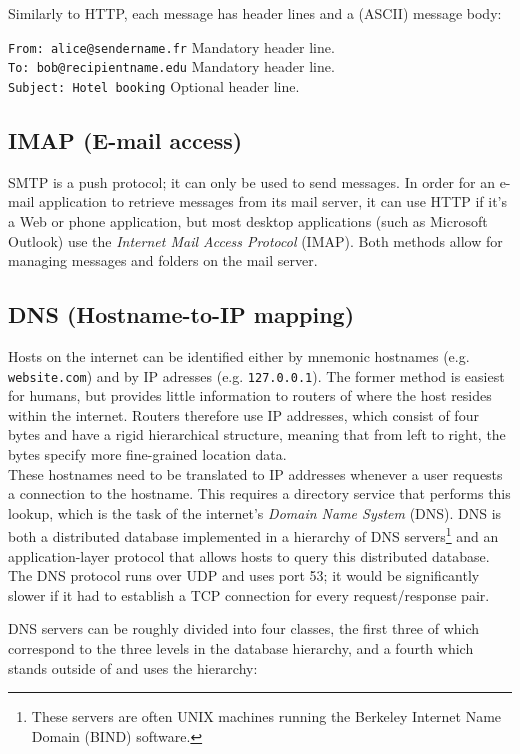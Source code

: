 \documentclass[table, xcdraw]{article}%
\begin{document}
Similarly to HTTP, each message has header lines and a (ASCII) message body:

\texttt{From: alice@sendername.fr} Mandatory header line.\\
\texttt{To: bob@recipientname.edu} Mandatory header line.\\
\texttt{Subject: Hotel booking} Optional header line.

\subsection{IMAP (E-mail access)}

SMTP is a push protocol; it can only be used to send messages. In order for an e-mail application to retrieve messages from its mail server, it can use HTTP if it's a Web or phone application, but most desktop applications (such as Microsoft Outlook) use the \emph{Internet Mail Access Protocol} (IMAP). Both methods allow for managing messages and folders on the mail server.

\subsection{DNS (Hostname-to-IP mapping)} \label{DNS}

Hosts on the internet can be identified either by mnemonic hostnames (e.g. \texttt{website.com}) and by IP adresses (e.g. \texttt{127.0.0.1}). The former method is easiest for humans, but provides little information to routers of where the host resides within the internet. Routers therefore use IP addresses, which consist of four bytes and have a rigid hierarchical structure, meaning that from left to right, the bytes specify more fine-grained location data.\\
These hostnames need to be translated to IP addresses whenever a user requests a connection to the hostname. This requires a directory service that performs this lookup, which is the task of the internet's \emph{Domain Name System} (DNS). DNS is both a distributed database implemented in a hierarchy of DNS servers\footnote{These servers are often UNIX machines running the Berkeley Internet Name Domain (BIND) software.} and an application-layer protocol that allows hosts to query this distributed database. The DNS protocol runs over UDP and uses port 53; it would be significantly slower if it had to establish a TCP connection for every request/response pair.

DNS servers can be roughly divided into four classes, the first three of which correspond to the three levels in the database hierarchy, and a fourth which stands outside of and uses the hierarchy:
\end{document}
